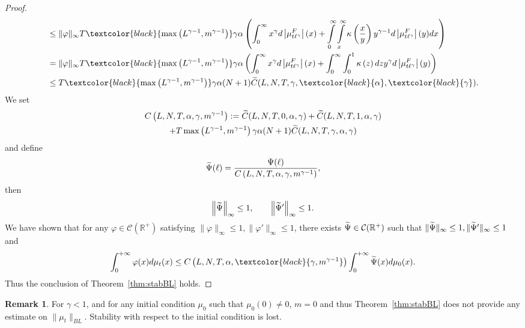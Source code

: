 \documentclass[10pt]{amsart}
\theoremstyle{definition}\newtheorem{defi}[theo]{Definition}\newtheorem{rema}[theo]{Remark}\newtheorem{exam}[theo]{Example}\newtheorem{exem}[theo]{Example}\newtheorem{nota}[theo]{Notation}
\newcommand*\dst{\displaystyle}
\newcommand*\R{\mathbb{R}}
\newcommand{\clC}{\mathcal{C}}
\newcommand{\comMD}[1]{\textcolor{black}{#1}}
\newcommand{\MT}[1]{\textcolor{black}{#1}}
\let\oldtilde\tilde
\renewcommand*{\tilde}[1]{\mathchoice{\widetilde{#1}}{\widetilde{#1}}{\oldtilde{#1}}{\oldtilde{#1}}}
\begin{document}
\begin{proof}
\begin{multline*}
\begin{aligned}
& \leq \|\varphi\|_{\infty} T\comMD{\max\left(L^{\gamma-1},m^{\gamma-1}\right)} \gamma \alpha \left(\int_0^{\infty} x^{\gamma} d \left|\mu_{t\ell^{\gamma}}^{F}\right|(x) + \int\limits_0^{\infty}
\int\limits_{x}^{\infty}\kappa\left(\dfrac{x}{y} \right) y^{\gamma-1} d \left|\mu_{t \ell^{\gamma}}^{F}\right| (y)dx \right)
\\
&=\|\varphi\|_{\infty} T\comMD{\max\left(L^{\gamma-1},m^{\gamma-1}\right)}\gamma \alpha\left(\dst\int_0^{\infty} x^{\gamma} d\left|\mu_{t\ell^{\gamma}}^{F}\right|(x) +\dst\int_0^{\infty}
\dst\int_{0}^{1}\kappa\left(z \right) dz y^{\gamma} d\left|\mu_{t \ell^{\gamma}}^{F}\right| (y)\right)\\
&\leq T\comMD{\max\left(L^{\gamma-1},m^{\gamma-1}\right)}\gamma \alpha (N+1) \tilde{C}(L,N,T,\gamma,\MT{\alpha},\MT{\gamma}).
\end{aligned}
\end{multline*}
We set 
\begin{multline*}
C\left(L,N,T,\alpha,\gamma,m^{\gamma-1}\right)
:=\tilde{C}(L,N,T,0,\alpha,\gamma)+\tilde{C}(L,N,T,1,\alpha,\gamma)\\
+ T\max\left(L^{\gamma-1},m^{\gamma-1}\right) \gamma \alpha (N+1) \tilde{C}(L,N,T,\gamma,\alpha,\gamma)
\end{multline*}
and define
\begin{equation*}
\tilde{\Psi} (\ell) = \dfrac{\Psi(\ell)}{C\left(L,N,T,\alpha,\gamma,m^{\gamma-1}\right)},
\end{equation*}
then
\begin{equation*}
\left\|\tilde{\Psi}\right\|_{\infty} \leq 1, \qquad \left\|\tilde{\Psi}'\right\|_{\infty} \leq 1.
\end{equation*}
We have shown that for any $\varphi \in \clC(\R^+)$ satisfying $\|\varphi\|_{\infty} \leq 1, \|\varphi'\|_{\infty} \leq 1$, there exists $\tilde{\Psi} \in \clC(\R^+)$ such that $\|\tilde{\Psi}\|_{\infty} \leq 1, \|\tilde{\Psi}'\|_{\infty} \leq 1$ and
\begin{equation*}
\dst\int_0^{+\infty} \varphi(x) d\mu_t(x) \leq C\left(L,N,T,\alpha,\MT{\gamma,m^{\gamma-1}}\right)\dst\int_0^{+\infty} \tilde{\Psi}(x) d\mu_0(x).
\end{equation*}
Thus the conclusion of Theorem~\ref{thm:stabBL} holds.
\end{proof}


\begin{rema}
For $\gamma<1$, and for any initial condition $\mu_0$ such that $\mu_0(0) \neq 0$, $m=0$ and thus Theorem~\ref{thm:stabBL} does not provide any estimate on $\|\mu_t\|_{BL}$. Stability with respect to the initial condition is lost.
\end{rema}
\end{document}
